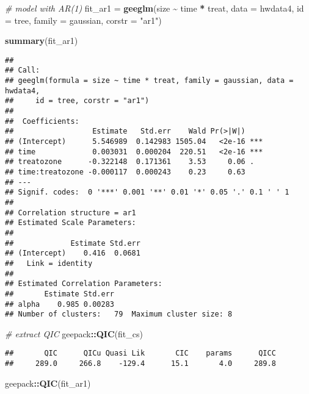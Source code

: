 \documentclass[
]{article}
\newenvironment{Shaded}{\begin{snugshade}}{\end{snugshade}}
\newcommand{\AttributeTok}[1]{\textcolor[rgb]{0.13,0.29,0.53}{#1}}
\newcommand{\CommentTok}[1]{\textcolor[rgb]{0.56,0.35,0.01}{\textit{#1}}}
\newcommand{\FunctionTok}[1]{\textcolor[rgb]{0.13,0.29,0.53}{\textbf{#1}}}
\newcommand{\NormalTok}[1]{#1}
\newcommand{\OtherTok}[1]{\textcolor[rgb]{0.56,0.35,0.01}{#1}}
\newcommand{\SpecialCharTok}[1]{\textcolor[rgb]{0.81,0.36,0.00}{\textbf{#1}}}
\newcommand{\StringTok}[1]{\textcolor[rgb]{0.31,0.60,0.02}{#1}}
\begin{document}
\begin{Shaded}
\begin{Highlighting}[]
\CommentTok{\# model with AR(1)}
\NormalTok{fit\_ar1 }\OtherTok{=}
  \FunctionTok{geeglm}\NormalTok{(size }\SpecialCharTok{\textasciitilde{}}\NormalTok{ time }\SpecialCharTok{*}\NormalTok{ treat,}
         \AttributeTok{data =}\NormalTok{ hwdata4,}
         \AttributeTok{id =}\NormalTok{ tree,}
         \AttributeTok{family =}\NormalTok{ gaussian,}
         \AttributeTok{corstr =} \StringTok{"ar1"}\NormalTok{)}

\FunctionTok{summary}\NormalTok{(fit\_ar1)}
\end{Highlighting}
\end{Shaded}

\begin{verbatim}
## 
## Call:
## geeglm(formula = size ~ time * treat, family = gaussian, data = hwdata4, 
##     id = tree, corstr = "ar1")
## 
##  Coefficients:
##                  Estimate   Std.err    Wald Pr(>|W|)    
## (Intercept)      5.546989  0.142983 1505.04   <2e-16 ***
## time             0.003031  0.000204  220.51   <2e-16 ***
## treatozone      -0.322148  0.171361    3.53     0.06 .  
## time:treatozone -0.000117  0.000243    0.23     0.63    
## ---
## Signif. codes:  0 '***' 0.001 '**' 0.01 '*' 0.05 '.' 0.1 ' ' 1
## 
## Correlation structure = ar1 
## Estimated Scale Parameters:
## 
##             Estimate Std.err
## (Intercept)    0.416  0.0681
##   Link = identity 
## 
## Estimated Correlation Parameters:
##       Estimate Std.err
## alpha    0.985 0.00283
## Number of clusters:   79  Maximum cluster size: 8
\end{verbatim}

\begin{Shaded}
\begin{Highlighting}[]
\CommentTok{\# extract QIC}
\NormalTok{geepack}\SpecialCharTok{::}\FunctionTok{QIC}\NormalTok{(fit\_cs)}
\end{Highlighting}
\end{Shaded}

\begin{verbatim}
##       QIC      QICu Quasi Lik       CIC    params      QICC 
##     289.0     266.8    -129.4      15.1       4.0     289.8
\end{verbatim}

\begin{Shaded}
\begin{Highlighting}[]
\NormalTok{geepack}\SpecialCharTok{::}\FunctionTok{QIC}\NormalTok{(fit\_ar1)}
\end{Highlighting}
\end{Shaded}
\end{document}
